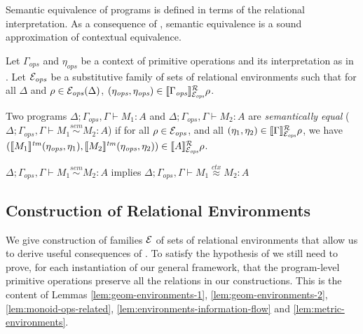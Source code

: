 Semantic equivalence of programs is defined in terms of the relational
interpretation. As a consequence of , semantic
equivalence is a sound approximation of contextual equivalence.
\begin{definition}\label{def:semantic-equality}
  Let $\Gamma_{\mathit{ops}}$ and $\eta_{\mathit{ops}}$ be a context
  of primitive operations and its interpretation as in
  . Let $\mathcal{E}_{\mathit{ops}}$ be a
  substitutive family of sets of relational environments such that for
  all $\Delta$ and $\rho \in \mathcal{E}_{\mathit{ops}}(\Delta)$,
  $(\eta_{\mathit{ops}}, \eta_{\mathit{ops}}) \in
  \llbracket \Gamma_{\mathit{ops}} \rrbracket^{\mathcal{R}}_{\mathcal{E}_{\mathit{ops}}}{\rho}$.

  Two programs $\Delta; \Gamma_{\mathit{ops}}, \Gamma \vdash M_1 : A$
  and $\Delta; \Gamma_{\mathit{ops}}, \Gamma \vdash M_2 : A$ are
  \emph{semantically equal} ($\Delta; \Gamma_{\mathit{ops}}, \Gamma
  \vdash M_1 \stackrel{sem}\sim M_2 : A$) if for all $\rho \in
  \mathcal{E}_{\mathit{ops}}$, and all $(\eta_1,\eta_2) \in
  \llbracket \Gamma \rrbracket^{\mathcal{R}}_{\mathcal{E}_{\mathit{ops}}}{\rho}$, we have
  $(\llbracket M_1 \rrbracket^{\mathit{tm}}(\eta_{\mathit{ops}},
  \eta_1),\llbracket M_2 \rrbracket^{\mathit{tm}}(\eta_{\mathit{ops}}, \eta_2)) \in
  \llbracket A \rrbracket^{\mathcal{R}}_{\mathcal{E}_{\mathit{ops}}}{\rho}$.
\end{definition}

\begin{theorem}[Soundness]\label{thm:soundness}
  $\Delta; \Gamma_{\mathit{ops}}, \Gamma \vdash M_1 \stackrel{sem}\sim M_2 : A$ implies
  $\Delta; \Gamma_{\mathit{ops}}, \Gamma \vdash M_1 \stackrel{ctx}\approx M_2 : A$
\end{theorem}

\subsection{Construction of Relational Environments}
\label{sec:constr-rel-env}

\newcommand{\Gen}{\mathrm{Gen}}
\newcommand{\Free}{\mathrm{Free}}
\newcommand{\semSort}[1]{\llbracket #1 \rrbracket^{\mathcal{S}}}
\newcommand{\semIndexExp}[1]{\llbracket #1 \rrbracket^{\mathcal{I}}}

We give construction of families $\mathcal{E}$ of sets of
relational environments that allow us to derive useful consequences of
. 
To satisfy the hypothesis of
 we still need to prove, for each
instantiation of our general framework, that the program-level
primitive operations preserve all the relations in our
constructions. This is the content of Lemmas
\ref{lem:geom-environments-1}, \ref{lem:geom-environments-2},
\ref{lem:monoid-ops-related}, \ref{lem:environments-information-flow}
and \ref{lem:metric-environments}.


